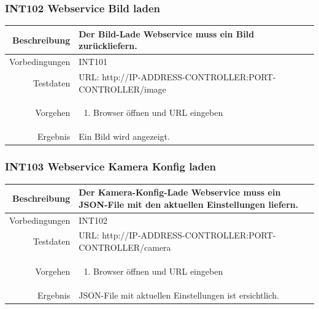 \subsubsection{INT102 Webservice Bild laden}
\begin{table}[h!]
	\renewcommand{\arraystretch}{1.5}
	\begin{tabular}{|r|p{14cm}|}
		\hline Beschreibung & Der Bild-Lade Webservice muss ein Bild zurückliefern. \\ 
		\hline Vorbedingungen & INT101 \\ 
		\hline Testdaten & URL: http://IP-ADDRESS-CONTROLLER:PORT-CONTROLLER/image \\ 
		\hline Vorgehen & 
		\begin{enumerate}
			\item Browser öffnen und URL eingeben
		\end{enumerate} \\ 
		\hline Ergebnis & Ein Bild wird angezeigt. \\ 
		\hline 
	\end{tabular}
\end{table}

\subsubsection{INT103 Webservice Kamera Konfig laden}
\begin{table}[h!]
	\renewcommand{\arraystretch}{1.5}
	\begin{tabular}{|r|p{14cm}|}
		\hline Beschreibung & Der Kamera-Konfig-Lade Webservice muss ein JSON-File mit den aktuellen Einstellungen liefern. \\ 
		\hline Vorbedingungen & INT102 \\ 
		\hline Testdaten & URL: http://IP-ADDRESS-CONTROLLER:PORT-CONTROLLER/camera \\ 
		\hline Vorgehen & 
		\begin{enumerate}
			\item Browser öffnen und URL eingeben
		\end{enumerate} \\ 
		\hline Ergebnis & JSON-File mit aktuellen Einstellungen ist ersichtlich. \\ 
		\hline 
	\end{tabular}
\end{table}

